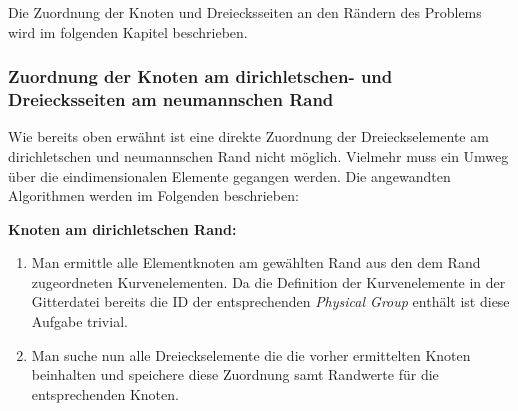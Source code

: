 Die Zuordnung der Knoten und Dreiecksseiten an den Rändern des Problems wird im folgenden Kapitel beschrieben.

\subsubsection{Zuordnung der Knoten am dirichletschen- und Dreiecksseiten am neumannschen Rand}
\label{sec:rb_assignment}
Wie bereits oben erwähnt ist eine direkte Zuordnung der Dreieckselemente am dirichletschen und neumannschen Rand nicht möglich. Vielmehr muss ein Umweg über die eindimensionalen Elemente gegangen werden. Die angewandten Algorithmen werden im Folgenden beschrieben: \newline

\textbf{Knoten am dirichletschen Rand:}
\begin{enumerate}
	\item Man ermittle alle Elementknoten am gewählten Rand aus den dem Rand zugeordneten Kurvenelementen. Da die Definition der Kurvenelemente in der Gitterdatei bereits die ID der entsprechenden \textit{Physical Group} enthält ist diese Aufgabe trivial.
	\item Man suche nun alle Dreieckselemente die die vorher ermittelten Knoten beinhalten und speichere diese Zuordnung samt Randwerte für die entsprechenden Knoten.
\end{enumerate}


